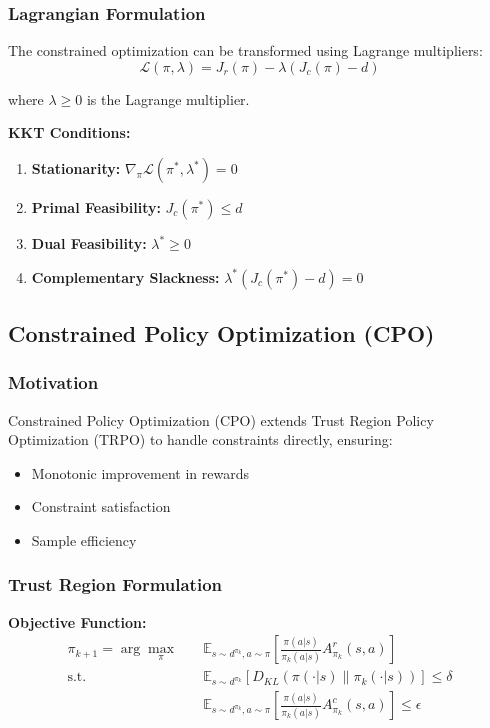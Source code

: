 \documentclass[12pt]{article}
\begin{document}
{{{{\subsubsection{Lagrangian Formulation}

The constrained optimization can be transformed using Lagrange multipliers:
\begin{equation}
\mathcal{L}(\pi, \lambda) = J_r(\pi) - \lambda(J_c(\pi) - d)
\end{equation}

where $\lambda \geq 0$ is the Lagrange multiplier.

\textbf{KKT Conditions:}
\begin{enumerate}
\item \textbf{Stationarity:} $\nabla_{\pi} \mathcal{L}(\pi^*, \lambda^*) = 0$
\item \textbf{Primal Feasibility:} $J_c(\pi^*) \leq d$
\item \textbf{Dual Feasibility:} $\lambda^* \geq 0$
\item \textbf{Complementary Slackness:} $\lambda^*(J_c(\pi^*) - d) = 0$
\end{enumerate}

\subsection{Constrained Policy Optimization (CPO)}

\subsubsection{Motivation}

Constrained Policy Optimization (CPO) extends Trust Region Policy Optimization (TRPO) to handle constraints directly, ensuring:
\begin{itemize}
\item Monotonic improvement in rewards
\item Constraint satisfaction
\item Sample efficiency
\end{itemize}

\subsubsection{Trust Region Formulation}

\textbf{Objective Function:}
\begin{align}
\pi_{k+1} = \arg\max_{\pi} \quad & \mathbb{E}_{s \sim d^{\pi_k}, a \sim \pi}\left[\frac{\pi(a|s)}{\pi_k(a|s)} A^r_{\pi_k}(s,a)\right] \\
\text{s.t.} \quad & \mathbb{E}_{s \sim d^{\pi_k}}\left[D_{KL}(\pi(\cdot|s) \| \pi_k(\cdot|s))\right] \leq \delta \\
& \mathbb{E}_{s \sim d^{\pi_k}, a \sim \pi}\left[\frac{\pi(a|s)}{\pi_k(a|s)} A^c_{\pi_k}(s,a)\right] \leq \epsilon
\end{align}

}}}}
\end{document}
